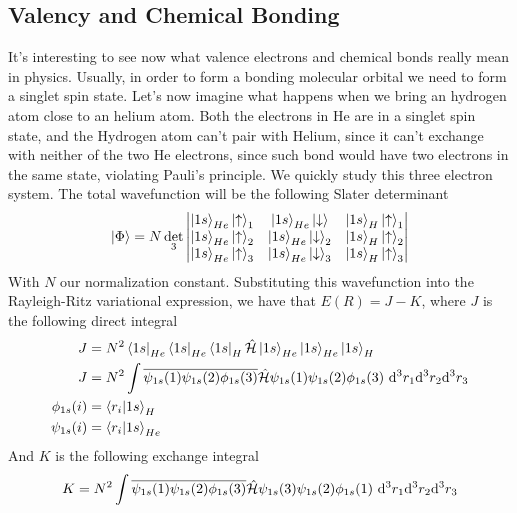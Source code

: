 \documentclass[../qm.tex]{subfiles}
\begin{document}
	\subsection{Valency and Chemical Bonding}
	It's interesting to see now what valence electrons and chemical bonds really mean in physics. Usually, in order to form a bonding molecular orbital we need to form a singlet spin state. Let's now imagine what happens when we bring an hydrogen atom close to an helium atom. Both the electrons in He are in a singlet spin state, and the Hydrogen atom can't pair with Helium, since it can't exchange with neither of the two He electrons, since such bond would have two electrons in the same state, violating Pauli's principle. We quickly study this three electron system. The total wavefunction will be the following Slater determinant
	\begin{equation}
		\ket{\Phi}=N\det_3\left|\begin{matrix}
			\ket{1s}_{He}\ket{\uparrow}_1&\ket{1s}_{He}\ket{\downarrow}&\ket{1s}_H\ket{\uparrow}_1\\
			\ket{1s}_{He}\ket{\uparrow}_2&\ket{1s}_{He}\ket{\downarrow}_2&\ket{1s}_H\ket{\uparrow}_2\\
			\ket{1s}_{He}\ket{\uparrow}_3&\ket{1s}_{He}\ket{\downarrow}_3&\ket{1s}_H\ket{\uparrow}_3
		\end{matrix}\right|
		\label{eq:HHewavefunction}
	\end{equation}
	With $N$ our normalization constant. Substituting this wavefunction into the Rayleigh-Ritz variational expression, we have that $E(R)=J-K$, where $J$ is the following direct integral
	\begin{equation}
		\begin{aligned}
			J&=N^2\bra{1s}_{He}\bra{1s}_{He}\bra{1s}_H\opr{\ham}\ket{1s}_{He}\ket{1s}_{He}\ket{1s}_H\\
			J&=N^2\int\cc{\psi_{1s}(1)\psi_{1s}(2)\phi_{1s}(3)}\opr{\ham}\psi_{1s}(1)\psi_{1s}(2)\phi_{1s}(3)\dddiff[3]{r_1}{r_2}{r_3}\\
			\phi_{1s}(i)&=\bra{r_i}\ket{1s}_H\\
			\psi_{1s}(i)&=\bra{r_i}\ket{1s}_{He}
		\end{aligned}
		\label{eq:HHedirectintegral}
	\end{equation}
	And $K$ is the following exchange integral
	\begin{equation}
		K=N^2\int\cc{\psi_{1s}(1)\psi_{1s}(2)\phi_{1s}(3)}\opr{\ham}\psi_{1s}(3)\psi_{1s}(2)\phi_{1s}(1)\dddiff[3]{r_1}{r_2}{r_3}
		\label{eq:HHeexchangeintegral}
	\end{equation}
\end{document}
